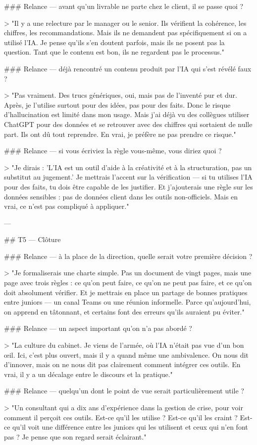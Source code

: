 ### Relance — avant qu'un livrable ne parte chez le client, il se passe quoi ?

> "Il y a une relecture par le manager ou le senior. Ils vérifient la cohérence, les chiffres, les recommandations. Mais ils ne demandent pas spécifiquement si on a utilisé l'IA. Je pense qu'ils s'en doutent parfois, mais ils ne posent pas la question. Tant que le contenu est bon, ils ne regardent pas le processus."

### Relance — déjà rencontré un contenu produit par l'IA qui s'est révélé faux ?

> "Pas vraiment. Des trucs génériques, oui, mais pas de l'inventé pur et dur. Après, je l'utilise surtout pour des idées, pas pour des faits. Donc le risque d'hallucination est limité dans mon usage. Mais j'ai déjà vu des collègues utiliser ChatGPT pour des données et se retrouver avec des chiffres qui sortaient de nulle part. Ils ont dû tout reprendre. En vrai, je préfère ne pas prendre ce risque."

### Relance — si vous écriviez la règle vous-même, vous diriez quoi ?

> "Je dirais : 'L'IA est un outil d'aide à la créativité et à la structuration, pas un substitut au jugement.' Je mettrais l'accent sur la vérification — si tu utilises l'IA pour des faits, tu dois être capable de les justifier. Et j'ajouterais une règle sur les données sensibles : pas de données client dans les outils non-officiels. Mais en vrai, ce n'est pas compliqué à appliquer."

---

## T5 — Clôture

### Relance — à la place de la direction, quelle serait votre première décision ?

> "Je formaliserais une charte simple. Pas un document de vingt pages, mais une page avec trois règles : ce qu'on peut faire, ce qu'on ne peut pas faire, et ce qu'on doit absolument vérifier. Et je mettrais en place un partage de bonnes pratiques entre juniors — un canal Teams ou une réunion informelle. Parce qu'aujourd'hui, on apprend en tâtonnant, et certains font des erreurs qu'ils auraient pu éviter."

### Relance — un aspect important qu'on n'a pas abordé ?

> "La culture du cabinet. Je viens de l'armée, où l'IA n'était pas vue d'un bon œil. Ici, c'est plus ouvert, mais il y a quand même une ambivalence. On nous dit d'innover, mais on ne nous dit pas clairement comment intégrer ces outils. En vrai, il y a un décalage entre le discours et la pratique."

### Relance — quelqu'un dont le point de vue serait particulièrement utile ?

> "Un consultant qui a dix ans d'expérience dans la gestion de crise, pour voir comment il perçoit ces outils. Est-ce qu'il les utilise ? Est-ce qu'il les craint ? Est-ce qu'il voit une différence entre les juniors qui les utilisent et ceux qui n'en font pas ? Je pense que son regard serait éclairant."